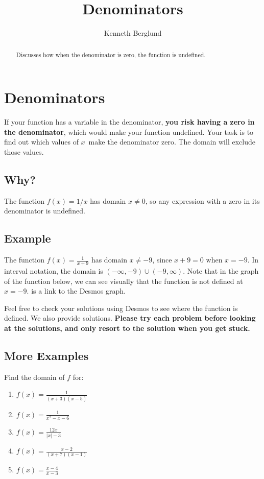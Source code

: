 \documentclass{ximera}
\title{Denominators}
\author{Kenneth Berglund}
\begin{document}
\begin{abstract}
Discusses how when the denominator is zero, the function is undefined. 
\end{abstract}
\maketitle

\section{Denominators}
If your function has a variable in the denominator, \textbf{you risk having a zero in the denominator}, which would make your function undefined. Your task is to find out which values of $x$ make the denominator zero. The domain will exclude those values.

\subsection{Why?}
The function $f(x) = 1/x$ has domain $x \ne 0$, so any expression with a zero in its denominator is undefined. 

\subsection{Example}
The function $f(x) = \frac{1}{x + 9}$ has domain $x \ne -9$, since $x + 9 = 0$ when $x = -9$. In interval notation, the domain is $(-\infty, -9) \cup (-9, \infty)$. Note that in the graph of the function below, we can see visually that the function is not defined at $x = -9$.  is a link to the Desmos graph. 

\begin{center}
\end{center}

Feel free to check your solutions using Desmos to see where the function is defined. We also provide solutions. \textbf{Please try each problem before looking at the solutions, and only resort to the solution when you get stuck.} 

\subsection{More Examples}
Find the domain of $f$ for:

\begin{enumerate}
	\item $f(x) = \frac{1}{(x + 3)(x - 5)}$
	\item $f(x) = \frac{1}{x^2 - x - 6}$
	\item $f(x) = \frac{12x}{|x| - 3}$
	\item $f(x) = \frac{x - 2}{(x + 7)(x - 1)}$
	\item $f(x) = \frac{x - 4}{x - 3}$
\end{enumerate}
\end{document}
